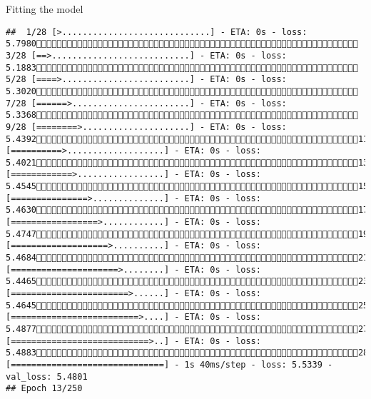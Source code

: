 \documentclass[
  ignorenonframetext,
]{beamer}
\begin{document}
\begin{frame}[fragile]{Fitting the model}
\begin{verbatim}
##  1/28 [>.............................] - ETA: 0s - loss: 5.7980 3/28 [==>...........................] - ETA: 0s - loss: 5.1883 5/28 [====>.........................] - ETA: 0s - loss: 5.3020 7/28 [======>.......................] - ETA: 0s - loss: 5.3368 9/28 [========>.....................] - ETA: 0s - loss: 5.439211/28 [==========>...................] - ETA: 0s - loss: 5.402113/28 [============>.................] - ETA: 0s - loss: 5.454515/28 [===============>..............] - ETA: 0s - loss: 5.463017/28 [=================>............] - ETA: 0s - loss: 5.474719/28 [===================>..........] - ETA: 0s - loss: 5.468421/28 [=====================>........] - ETA: 0s - loss: 5.446523/28 [=======================>......] - ETA: 0s - loss: 5.464525/28 [=========================>....] - ETA: 0s - loss: 5.487727/28 [===========================>..] - ETA: 0s - loss: 5.488328/28 [==============================] - 1s 40ms/step - loss: 5.5339 - val_loss: 5.4801
## Epoch 13/250

\end{verbatim}
\end{frame}
\end{document}
